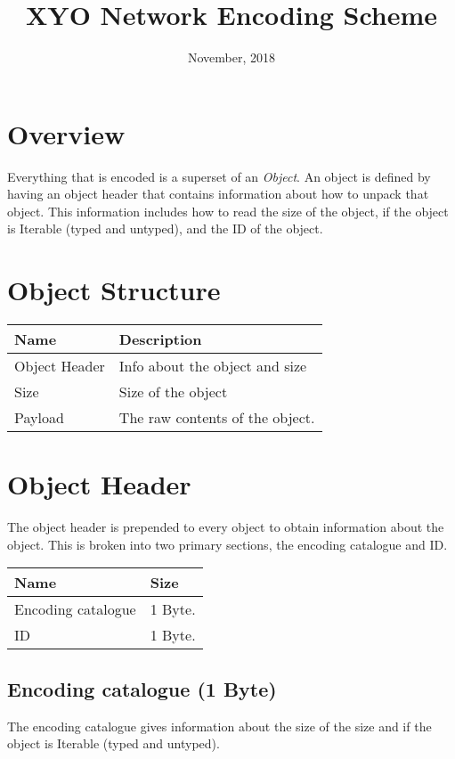 \documentclass[11pt]{article}
\title{XYO Network Encoding Scheme}
\date{November, 2018}
\begin{document}
\maketitle


\section{Overview}
Everything that is encoded is a superset of an \textit{Object}. An object is defined by having an object header that contains information about how to unpack that object. This information includes how to read the size of the object, if the object is Iterable (typed and untyped), and the ID of the object.

\section{Object Structure}
\begin{center}
\begin{tabular}{ |l|l| } 
\hline
\textbf{Name} & \textbf{Description}\\
\hline
Object Header & Info about the object and size \\   
Size & Size of the object \\  
Payload & The raw contents of the object. \\  
\hline
\end{tabular}
\end{center}

\section{Object Header}
The object header is prepended to every object to obtain information about the object. This is broken into two primary sections, the encoding catalogue and ID. 

\begin{center}
\begin{tabular}{ |l|l| } 
\hline
\textbf{Name} & \textbf{Size}\\
\hline
Encoding catalogue & 1 Byte. \\  
ID & 1 Byte. \\  
\hline
\end{tabular}
\end{center}


\subsection{Encoding catalogue (1 Byte)}
The encoding catalogue gives information about the size of the size and if the object is Iterable (typed and untyped).
\end{document}
